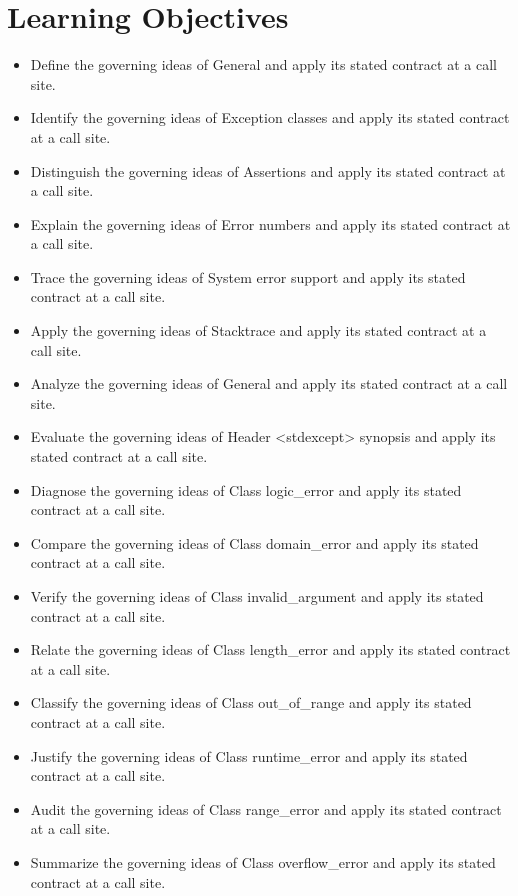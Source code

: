 \documentclass[11pt,letterpaper]{article}
\begin{document}
\section{Learning Objectives}
\begin{itemize}[label=\textcolor{CornellReferenceTeal}{$\blacktriangleright$}]
\item Define the governing ideas of General and apply its stated contract at a call site.
\item Identify the governing ideas of Exception classes and apply its stated contract at a call site.
\item Distinguish the governing ideas of Assertions and apply its stated contract at a call site.
\item Explain the governing ideas of Error numbers and apply its stated contract at a call site.
\item Trace the governing ideas of System error support and apply its stated contract at a call site.
\item Apply the governing ideas of Stacktrace and apply its stated contract at a call site.
\item Analyze the governing ideas of General and apply its stated contract at a call site.
\item Evaluate the governing ideas of Header <stdexcept> synopsis and apply its stated contract at a call site.
\item Diagnose the governing ideas of Class logic\_\allowbreak{}error and apply its stated contract at a call site.
\item Compare the governing ideas of Class domain\_\allowbreak{}error and apply its stated contract at a call site.
\item Verify the governing ideas of Class invalid\_\allowbreak{}argument and apply its stated contract at a call site.
\item Relate the governing ideas of Class length\_\allowbreak{}error and apply its stated contract at a call site.
\item Classify the governing ideas of Class out\_\allowbreak{}of\_\allowbreak{}range and apply its stated contract at a call site.
\item Justify the governing ideas of Class runtime\_\allowbreak{}error and apply its stated contract at a call site.
\item Audit the governing ideas of Class range\_\allowbreak{}error and apply its stated contract at a call site.
\item Summarize the governing ideas of Class overflow\_\allowbreak{}error and apply its stated contract at a call site.
\end{itemize}
\end{document}
